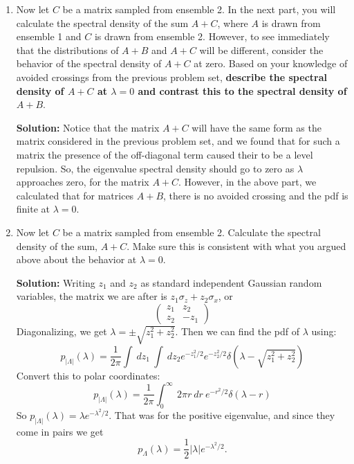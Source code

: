 \documentclass[a4paper]{article}
\begin{document}
\begin{enumerate}[label=(\alph*)]
\item Now let $C$ be a matrix sampled from ensemble 2.  In the next part, you will calculate the spectral density of the sum $A + C$, where $A$ is drawn from ensemble 1 and $C$ is drawn from ensemble 2.  However, to see immediately that the distributions of $A+B$ and $A+C$ will be different, consider the behavior of the spectral density of $A+C$ at zero.  Based on your knowledge of avoided crossings from the previous problem set, \textbf{describe the spectral density of $A+C$ at $\lambda =0$ and contrast this to the spectral density of $A+B$}.  

\begin{tcolorbox}
\textbf{Solution:}
Notice that the matrix $A+C$ will have the same form as the matrix considered in the previous problem set, and we found that for such a matrix the presence of the off-diagonal term caused their to be a level repulsion.  So, the eigenvalue spectral density should go to zero as $\lambda$ approaches zero, for the matrix $A+C$.  However, in the above part, we calculated that for matrices $A+B$, there is no avoided crossing and the pdf is finite at $\lambda = 0$.
\end{tcolorbox}

\item Now let $C$ be a matrix sampled from ensemble 2.  Calculate the spectral density of the sum, $A + C$.  Make sure this is consistent with what you argued above about the behavior at $\lambda = 0$.

\begin{tcolorbox}
\textbf{Solution:}
Writing $z_1$ and $z_2$ as standard independent Gaussian random variables, the matrix we are after is $z_1 \sigma_z + z_2\sigma_x$, or
\begin{equation}
    \left( \begin{array}{cc} z_1 & z_2 \\ z_2 & -z_1 \end{array} \right)
\end{equation}
Diagonalizing, we get $\lambda = \pm \sqrt{z_1^2 + z_2^2}$.  Then we can find the pdf of $\lambda$ using:
\begin{equation}
    p_{|\Lambda|}(\lambda) = \frac{1}{2\pi} \int~dz_1 ~\int~dz_2 e^{-z_1^2/2}e^{-z_2^2/2} \delta \left(\lambda - \sqrt{z_1^2 + z_2^2}\right)
\end{equation}
Convert this to polar coordinates:
\begin{equation}
    p_{|\Lambda|}(\lambda) = \frac{1}{2\pi} \int_0^\infty ~2\pi r ~dr~ e^{-r^2/2}\delta(\lambda - r)
\end{equation}
So $p_{|\Lambda|}(\lambda) = \lambda e^{-\lambda^2/2}$.  That was for the positive eigenvalue, and since they come in pairs we get 
\begin{equation}
    p_\Lambda(\lambda) = \frac{1}{2}|\lambda| e^{-\lambda^2/2}.
\end{equation}


\end{tcolorbox}
\end{enumerate}
\end{document}
